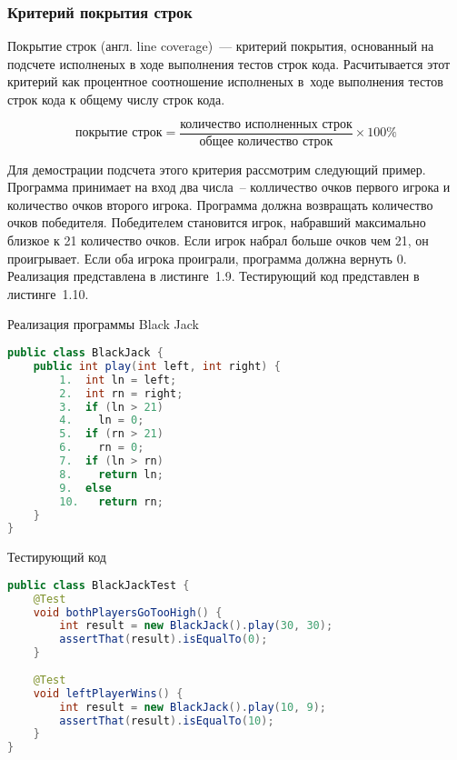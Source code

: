 \subsubsection{Критерий покрытия строк}

Покрытие строк (англ. line coverage)~--- критерий покрытия, основанный на подсчете исполненых в ходе выполнения тестов строк кода. Расчитывается этот критерий как процентное соотношение исполненых в~ходе выполнения тестов строк кода к общему числу строк кода.

\[ \text{покрытие строк} = \frac{\text{количество исполненных строк}}{\text{общее количество строк}}  \times 100 \% \]

Для демострации подсчета этого критерия рассмотрим следующий пример. Программа принимает на вход два числа~-- колличество очков первого игрока и количество очков второго игрока. Программа должна возвращать количество очков победителя. Победителем становится игрок, набравший максимально близкое к 21 количество очков. Если игрок набрал больше очков чем 21, он проигрывает. Если оба игрока проиграли, программа должна вернуть 0. Реализация представлена в листинге~1.9. Тестирующий код представлен в листинге~1.10.

\begin{ListingEnv}[!h]%
	\captiondelim{ } %
	\caption{Реализация программы Black Jack}
	\begin{lstlisting}[language={Java}]
public class BlackJack {
	public int play(int left, int right) {
		1.  int ln = left;
		2.  int rn = right;
		3.  if (ln > 21)
		4.    ln = 0;
		5.  if (rn > 21)
		6.    rn = 0;
		7.  if (ln > rn)
		8.    return ln;
		9.  else
		10.   return rn;
	}
}
	\end{lstlisting}
\end{ListingEnv}%

\begin{ListingEnv}[!h]%
	\captiondelim{ } %
	\caption{Тестирующий код}
	\begin{lstlisting}[language={Java}]
public class BlackJackTest {
	@Test
	void bothPlayersGoTooHigh() {
		int result = new BlackJack().play(30, 30);
		assertThat(result).isEqualTo(0);
	}
	
	@Test
	void leftPlayerWins() {
		int result = new BlackJack().play(10, 9);
		assertThat(result).isEqualTo(10);
	}
}
	\end{lstlisting}
\end{ListingEnv}%

